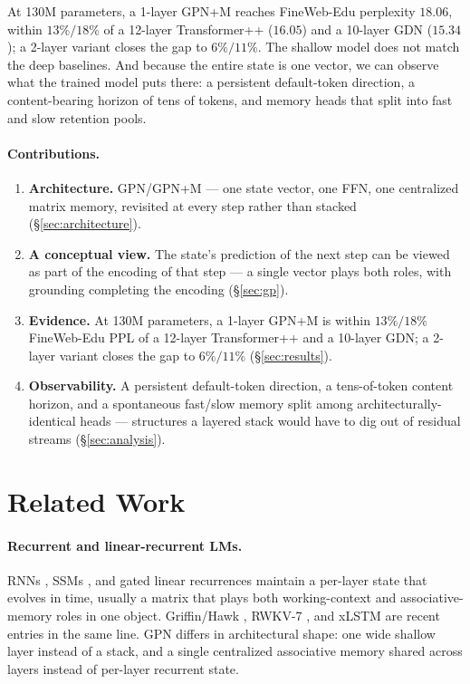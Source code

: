 \documentclass{article}
\begin{document}
At 130M parameters, a 1-layer GPN+M reaches FineWeb-Edu perplexity
$18.06$, within $13\%/18\%$ of a 12-layer Transformer++ ($16.05$)
and a 10-layer GDN ($15.34$); a 2-layer variant closes the gap to
$6\%/11\%$. The shallow model does not match the deep baselines. And
because the entire state is one vector, we can observe what the
trained model puts there: a persistent default-token direction, a
content-bearing horizon of tens of tokens, and memory heads that
split into fast and slow retention pools.

\paragraph{Contributions.}
\begin{enumerate}
\setlength{\itemsep}{0pt}
\item \textbf{Architecture.} GPN/GPN+M --- one state vector, one
FFN, one centralized matrix memory, revisited at every step rather
than stacked (\S\ref{sec:architecture}).
\item \textbf{A conceptual view.} The state's prediction of the
next step can be viewed as part of the encoding of that step ---
a single vector plays both roles, with grounding completing the
encoding (\S\ref{sec:gp}).
\item \textbf{Evidence.} At 130M parameters, a 1-layer GPN+M is
within $13\%/18\%$ FineWeb-Edu PPL of a 12-layer Transformer++ and
a 10-layer GDN; a 2-layer variant closes the gap to $6\%/11\%$
(\S\ref{sec:results}).
\item \textbf{Observability.} A persistent default-token direction,
a tens-of-token content horizon, and a spontaneous fast/slow memory
split among architecturally-identical heads --- structures a layered
stack would have to dig out of residual streams
(\S\ref{sec:analysis}).
\end{enumerate}

\section{Related Work}

\paragraph{Recurrent and linear-recurrent LMs.} RNNs
\cite{hochreiter1997long}, SSMs \cite{gu2021efficiently,gu2023mamba},
and gated linear recurrences
\cite{yang2023gatedlinear,dao2024transformers,yang2024gated} maintain
a per-layer state that evolves in time, usually a matrix that plays
both working-context and associative-memory roles in one object.
Griffin/Hawk \cite{de2024griffin}, RWKV-7 \cite{peng2025rwkv7}, and
xLSTM \cite{beck2024xlstm} are recent entries in the same line. GPN
differs in architectural shape: one wide shallow layer instead of a
stack, and a single centralized associative memory shared across
layers instead of per-layer recurrent state.
\end{document}
